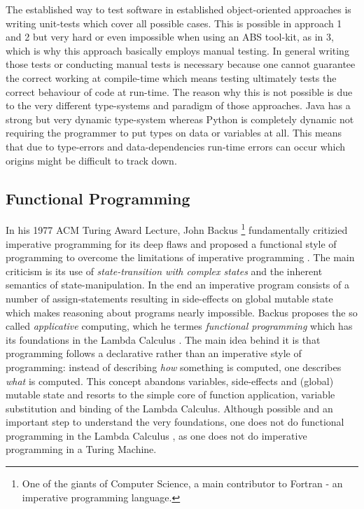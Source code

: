 The established way to test software in established object-oriented approaches is writing unit-tests which cover all possible cases. This is possible in approach 1 and 2 but very hard or even impossible when using an ABS tool-kit, as in 3, which is why this approach basically employs manual testing. In general writing those tests or conducting manual tests is necessary because one cannot guarantee the correct working at compile-time which means testing ultimately tests the correct behaviour of code at run-time. The reason why this is not possible is due to the very different type-systems and paradigm of those approaches. Java has a strong but very dynamic type-system whereas Python is completely dynamic not requiring the programmer to put types on data or variables at all. This means that due to type-errors and data-dependencies run-time errors can occur which origins might be difficult to track down.



\subsection{Functional Programming}
In his 1977 ACM Turing Award Lecture, John Backus \footnote{One of the giants of Computer Science, a main contributor to Fortran - an imperative programming language.} fundamentally critizied imperative programming for its deep flaws and proposed a functional style of programming to overcome the limitations of imperative programming \cite{backus_can_1978}. The main criticism is its use of \textit{state-transition with complex states} and the inherent semantics of state-manipulation. In the end an imperative program consists of a number of assign-statements resulting in side-effects on global mutable state which makes reasoning about programs nearly impossible. Backus proposes the so called \textit{applicative} computing, which he termes \textit{functional programming} which has its foundations in the Lambda Calculus \cite{church_calculi_1941}. The main idea behind it is that programming follows a declarative rather than an imperative style of programming: instead of describing \textit{how} something is computed, one describes \textit{what} is computed. This concept abandons variables, side-effects and (global) mutable state and resorts to the simple core of function application, variable substitution and binding of the Lambda Calculus. Although possible and an important step to understand the very foundations, one does not do functional programming in the Lambda Calculus \cite{michaelson_introduction_2011}, as one does not do imperative programming in a Turing Machine.

